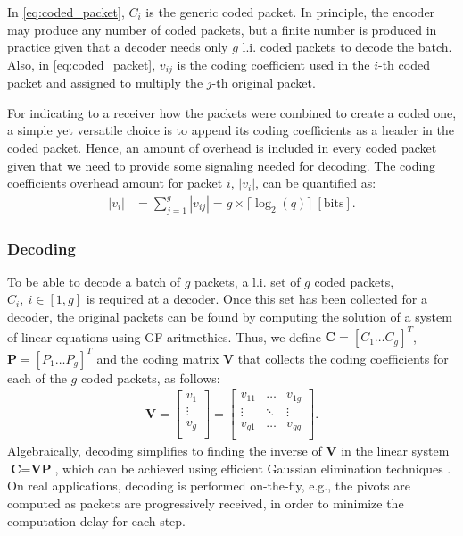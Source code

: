 In \eqref{eq:coded_packet}, $C_i$ is the generic coded packet. In principle,
the encoder may produce any number of coded packets, but a finite
number is produced in practice given that a decoder needs only
$g$ \ac{l.i.} coded packets to decode the batch. Also, in
\eqref{eq:coded_packet}, $v_{ij}$ is the coding coefficient used in the
$i$-th coded packet and assigned to multiply the $j$-th original packet.

For indicating to a receiver how the packets were combined
to create a coded one, a simple yet versatile choice is to append
its coding coefficients as a header in the coded packet. Hence, an
amount of overhead is included in every coded packet given that we
need to provide some signaling needed for decoding. The coding
coefficients overhead amount for packet $i$, $|v_i|$, can be quantified
as:
%
\begin{align} \label{eq:coded_packet_coef}
|v_i| &= \sum_{j=1}^{g} |v_{ij}| = g \times \lceil \log_{2} (q)
\rceil ~ [\mathrm{bits}].
\end{align}

\subsubsection{Decoding}
\label{sssec:decoding}
To be able to decode a batch of $g$ packets, a \ac{l.i.} set of $g$
coded packets, $C_i,\ i \in [1,g]$ is required at a decoder.
Once this set has been collected for a decoder,
the original packets can be found by computing the solution of a system
of linear equations using \ac{GF} aritmethics. Thus, we define
$\textbf{C} = \left[C_1 \ldots C_g \right]^T$,
$\textbf{P} = \left[P_1 \ldots P_g \right]^T$ and the coding matrix
$\textbf{V}$ that collects the coding coefficients for each of the $g$
coded packets, as follows:
%
\begin{align} \label{eq:coding_matrix}
\textbf{V} =
\left[
\begin{array}{c}
        v_1    \\ \hline
        \vdots \\ \hline
        v_g    \\
\end{array}
\right]
=
\left[
\begin{array}{ccc}
        v_{11} & \ldots & v_{1g} \\
        \vdots  & \ddots & \vdots  \\
        v_{g1} & \ldots & v_{gg} \\
\end{array}
\right].
\end{align}
%
Algebraically, decoding simplifies to finding the inverse of
$\textbf{V}$ in the linear system
$\textbf{C} = \textbf{V} \textbf{P}$, which can be achieved using
efficient Gaussian elimination techniques \cite{fragouli2006network}.
On real applications, decoding is performed on-the-fly, e.g., the
pivots are computed as packets are progressively received, in order to
minimize the computation delay for each step.

